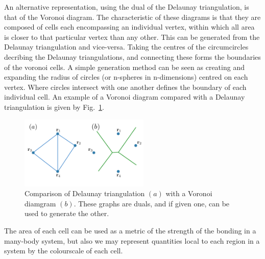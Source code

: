 An alternative representation, using the dual of the Delaunay triangulation, is that of the Voronoi diagram. The characteristic of these diagrams is that they are composed of cells each encompassing an individual vertex, within which all area is closer to that particular vertex than any other. This can be generated from the Delaunay triangulation and vice-versa. Taking the centres of the circumcircles decribing the Delaunay triangulations, and connecting these forms the boundaries of the voronoi cells. A simple generation method can be seen as creating and expanding the radius of circles (or n-spheres in n-dimensions) centred on each vertex. Where circles intersect with one another defines the boundary of each individual cell. An example of a Voronoi diagram compared with a Delaunay triangulation is given by Fig.~\ref{fig:voronoi}.
\begin{figure}\centering
    \includegraphics[width=0.55\textwidth]{Images/ch6_phasegineer/imgs/voronoi}
    \caption{Comparison of Delaunay triangulation $(a)$ with a Voronoi diamgram $(b)$. These graphs are duals, and if given one, can be used to generate the other.}\label{fig:voronoi}
\end{figure}
The area of each cell can be used as a metric of the strength of the bonding in a many-body system, but also we may represent quantities local to each region in a system by the colourscale of each cell.
